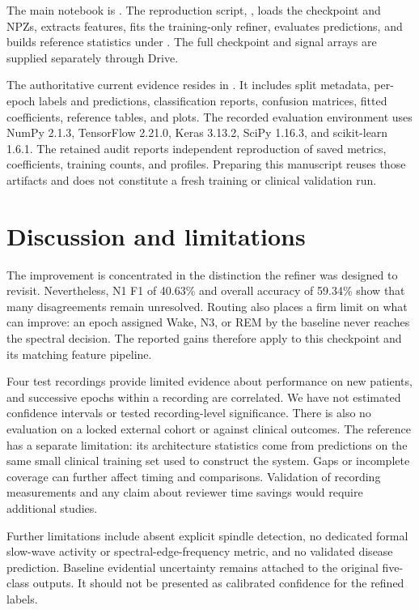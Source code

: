 \documentclass[pdflatex,sn-mathphys-num]{sn-jnl}
\begin{document}
The main notebook is . The reproduction script, , loads the checkpoint and NPZs, extracts features, fits the training-only refiner, evaluates predictions, and builds reference statistics under . The full checkpoint and signal arrays are supplied separately through Drive.

The authoritative current evidence resides in . It includes split metadata, per-epoch labels and predictions, classification reports, confusion matrices, fitted coefficients, reference tables, and plots. The recorded evaluation environment uses NumPy 2.1.3, TensorFlow 2.21.0, Keras 3.13.2, SciPy 1.16.3, and scikit-learn 1.6.1. The retained audit reports independent reproduction of saved metrics, coefficients, training counts, and profiles. Preparing this manuscript reuses those artifacts and does not constitute a fresh training or clinical validation run.

\section{Discussion and limitations}\label{sec:discussion}
The improvement is concentrated in the distinction the refiner was designed to revisit. Nevertheless, N1 F1 of 40.63\% and overall accuracy of 59.34\% show that many disagreements remain unresolved. Routing also places a firm limit on what can improve: an epoch assigned Wake, N3, or REM by the baseline never reaches the spectral decision. The reported gains therefore apply to this checkpoint and its matching feature pipeline.

Four test recordings provide limited evidence about performance on new patients, and successive epochs within a recording are correlated. We have not estimated confidence intervals or tested recording-level significance. There is also no evaluation on a locked external cohort or against clinical outcomes. The reference has a separate limitation: its architecture statistics come from predictions on the same small clinical training set used to construct the system. Gaps or incomplete coverage can further affect timing and comparisons. Validation of recording measurements and any claim about reviewer time savings would require additional studies.

Further limitations include absent explicit spindle detection, no dedicated formal slow-wave activity or spectral-edge-frequency metric, and no validated disease prediction. Baseline evidential uncertainty remains attached to the original five-class outputs. It should not be presented as calibrated confidence for the refined labels.
\end{document}
